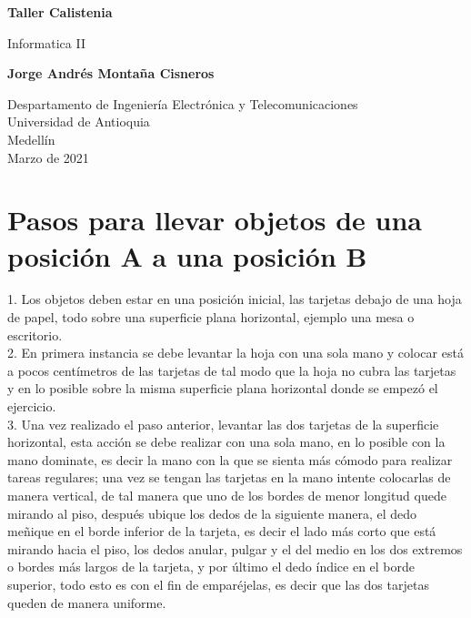 \documentclass{article}
\begin{document}
\begin{titlepage}
    \begin{center}
        \vspace*{1cm}
            
        \Huge
        \textbf{Taller Calistenia}
            
        \vspace{0.5cm}
        \LARGE
        Informatica II
            
        \vspace{1.5cm}
            
        \textbf{Jorge Andrés Montaña Cisneros}
            
        \vfill
            
        \vspace{0.8cm}
            
        \Large
        Despartamento de Ingeniería Electrónica y Telecomunicaciones\\
        Universidad de Antioquia\\
        Medellín\\
        Marzo de 2021
            
    \end{center}
\end{titlepage}

\tableofcontents

\newpage

\section{Pasos para llevar objetos de una posición A a una posición B}

1.	Los objetos deben estar en una posición inicial, las tarjetas debajo de una hoja de papel, todo sobre una superficie plana horizontal, ejemplo una mesa o escritorio.\\

2.	En primera instancia se debe levantar la hoja con una sola mano y colocar está a pocos centímetros de las tarjetas de tal modo que la hoja no cubra las tarjetas y en lo posible sobre la misma superficie plana horizontal donde se empezó el ejercicio.\\


3.	Una vez realizado el paso anterior, levantar las dos tarjetas de la superficie horizontal, esta acción se debe realizar con una sola mano, en lo posible con la mano dominate, es decir la mano con la que se sienta más cómodo para realizar tareas regulares; una vez se tengan las tarjetas en la mano intente colocarlas de manera vertical, de tal manera que uno  de los bordes de menor longitud  quede mirando al piso, después ubique los dedos de la siguiente manera, el dedo meñique en el borde inferior de la tarjeta, es decir el lado más corto que está mirando hacia el piso, los dedos anular, pulgar y el del medio en los dos extremos o bordes más largos de la tarjeta, y por último el dedo índice en el borde superior, todo esto es con el fin de  emparéjelas, es decir que las dos tarjetas queden de manera uniforme.\\
\end{document}
